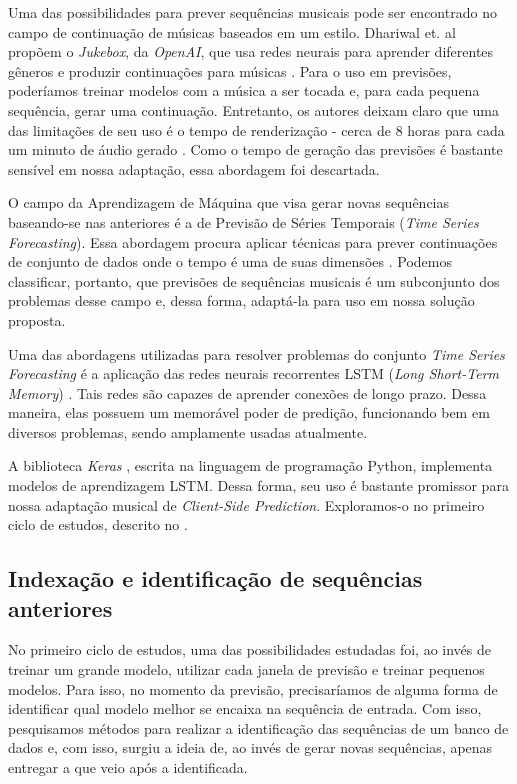 Uma das possibilidades para prever sequências musicais pode ser encontrado no campo de continuação de músicas baseados em um estilo. Dhariwal et. al propõem o \textit{Jukebox}, da \textit{OpenAI}, que usa redes neurais para aprender diferentes gêneros e produzir continuações para músicas \cite{jukebox}. Para o uso em previsões, poderíamos treinar modelos com a música a ser tocada e, para cada pequena sequência, gerar uma continuação. Entretanto, os autores deixam claro que uma das limitações de seu uso é o tempo de renderização - cerca de 8 horas para cada um minuto de áudio gerado \cite{jukebox}. Como o tempo de geração das previsões é bastante sensível em nossa adaptação, essa abordagem foi descartada.

O campo da Aprendizagem de Máquina que visa gerar novas sequências baseando-se nas anteriores é a de Previsão de Séries Temporais (\textit{Time Series Forecasting}). Essa abordagem procura aplicar técnicas para prever continuações de conjunto de dados onde o tempo é uma de suas dimensões \cite{time_series_forecasting}. Podemos classificar, portanto, que previsões de sequências musicais é um subconjunto dos problemas desse campo e, dessa forma, adaptá-la para uso em nossa solução proposta.

Uma das abordagens utilizadas para resolver problemas do conjunto \textit{Time Series Forecasting} é a aplicação das redes neurais recorrentes LSTM (\textit{Long Short-Term Memory}) \cite{lstm}. Tais redes são capazes de aprender conexões de longo prazo. Dessa maneira, elas possuem um memorável poder de predição, funcionando bem em diversos problemas, sendo amplamente usadas atualmente.

A biblioteca \textit{Keras} \cite{keras}, escrita na linguagem de programação Python, implementa modelos de aprendizagem LSTM. Dessa forma, seu uso é bastante promissor para nossa adaptação musical de \textit{Client-Side Prediction}. Exploramos-o no primeiro ciclo de estudos, descrito no .

\subsection{Indexação e identificação de sequências anteriores}
\label{subsec:indexation_and_identification}

No primeiro ciclo de estudos, uma das possibilidades estudadas foi, ao invés de treinar um grande modelo, utilizar cada janela de previsão e treinar pequenos modelos. Para isso, no momento da previsão, precisaríamos de alguma forma de identificar qual modelo melhor se encaixa na sequência de entrada. Com isso, pesquisamos métodos para realizar a identificação das sequências de um banco de dados e, com isso, surgiu a ideia de, ao invés de gerar novas sequências, apenas entregar a que veio após a identificada. 

